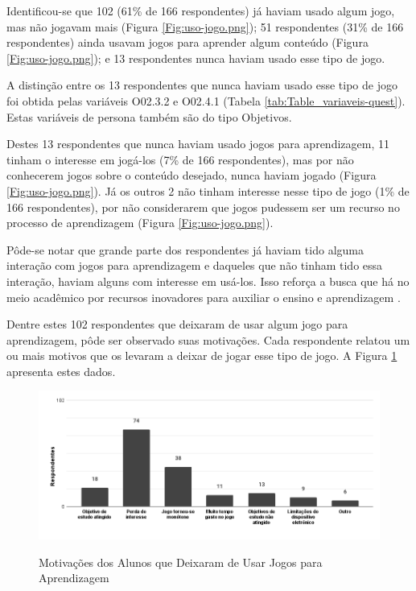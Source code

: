 Identificou-se que 102 (61\% de 166 respondentes) já haviam usado algum jogo, mas não jogavam mais (Figura \ref{Fig:uso-jogo.png});  51 respondentes (31\% de 166 respondentes) ainda usavam jogos para aprender algum conteúdo (Figura \ref{Fig:uso-jogo.png}); e 13 respondentes nunca haviam usado esse tipo de jogo.

A distinção entre os 13 respondentes que nunca haviam usado esse tipo de jogo foi obtida pelas variáveis O02.3.2 e O02.4.1 (Tabela \ref{tab:Table_variaveis-quest}). Estas variáveis de persona também são do tipo Objetivos. 

Destes 13 respondentes que nunca haviam usado jogos para aprendizagem, 11 tinham o interesse em jogá-los (7\% de 166 respondentes), mas por não conhecerem jogos sobre o conteúdo desejado, nunca haviam jogado (Figura \ref{Fig:uso-jogo.png}). Já os outros 2 não tinham interesse nesse tipo de jogo (1\% de 166 respondentes), por não considerarem que jogos pudessem ser um recurso no processo de aprendizagem (Figura \ref{Fig:uso-jogo.png}).

Pôde-se notar que grande parte dos respondentes já haviam tido alguma interação com jogos para aprendizagem e daqueles que não tinham tido essa interação, haviam alguns com interesse em usá-los. Isso reforça a busca que há no meio acadêmico por recursos inovadores para auxiliar o ensino e aprendizagem \cite{battistella,brito,Sales2020,Sales2020UsoTDS}.

Dentre estes 102 respondentes que deixaram de usar algum jogo para aprendizagem, pôde ser observado suas motivações. Cada respondente relatou um ou mais motivos que os levaram a deixar de jogar esse tipo de jogo. A Figura \ref{Fig:deixa-jogo.png} apresenta estes dados.

\begin{figure}[htbp]
	\centering
	\caption{Motivações dos Alunos que Deixaram de Usar Jogos para Aprendizagem}
	\includegraphics[keepaspectratio=true,scale=0.5]{figuras/resultados/deixa-jogo.png}
	\label{Fig:deixa-jogo.png}
\end{figure}

